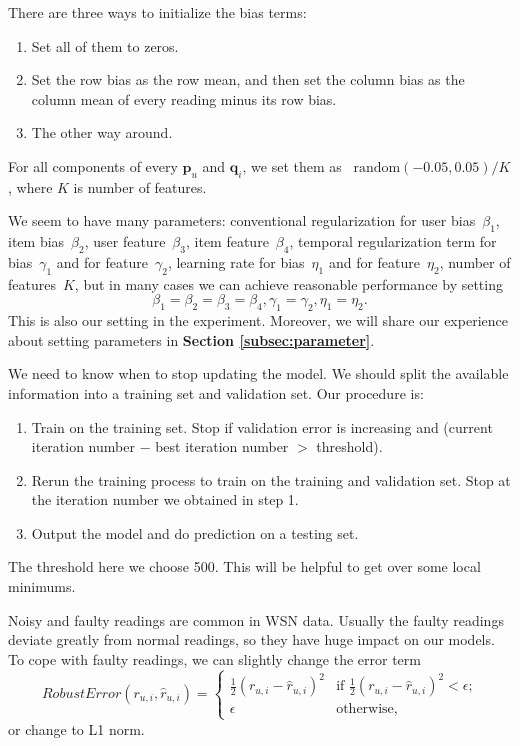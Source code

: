 
There are three ways to initialize the bias terms:
\begin{enumerate}
	\setlength {\itemsep}{-5pt}
	\item Set all of them to zeros.
	\item Set the row bias as the row mean, and then set the column bias as the column mean of every reading minus its row bias.
	\item The other way around.
\end{enumerate}
For all components of every $\mathbf{p}_{u}$ and $\mathbf{q}_{i}$, we set them as ~$\mbox{random}(-0.05,0.05)/K$, where $K$ is number of features.


We seem to have many parameters: conventional regularization for user bias~$\beta_1$, item bias~$\beta_2$, user feature~$\beta_3$, item feature~$\beta_4$, temporal regularization term for bias~$\gamma_1$ and for feature~$\gamma_2$, learning rate for bias~$\eta_1$ and for feature~$\eta_2$, number of features~$K$, but in many cases we can achieve reasonable performance by setting 
\begin{equation*}\beta_1 = \beta_2 = \beta_3 = \beta_4, \gamma_1 = \gamma_2, \eta_1 = \eta_2. \end{equation*}
This is also our setting in the experiment. Moreover, we will share our experience about setting parameters in \textbf{Section \ref{subsec:parameter}}.

We need to know when to stop updating the model. We should split the available information into a training set and validation set. Our procedure is:
\begin{enumerate}
	\item Train on the training set. Stop if validation error is increasing and (current iteration number $-$ best iteration number $>$ threshold).  
	\item Rerun the training process to train on the training and validation set. Stop at the iteration number we obtained in step 1.
	\item Output the model and do prediction on a testing set. 
\end{enumerate}
The threshold here we choose 500. This will be helpful to get over some local minimums.


Noisy and faulty readings are common in WSN data. Usually the faulty readings deviate greatly from normal readings, so they have huge impact on our models. To cope with faulty readings, we can slightly change the error term
\begin{equation*}RobustError(r_{u,i}, \hat{r}_{u,i}) = 
\begin{cases}
	\frac{1}{2}(r_{u,i}-\hat{r}_{u,i})^2 & \mbox{if $\frac{1}{2}(r_{u,i}-\hat{r}_{u,i})^2 < \epsilon$;}\\
	\epsilon & \mbox{otherwise},
\end{cases}
\end{equation*}
or change to L1 norm.

